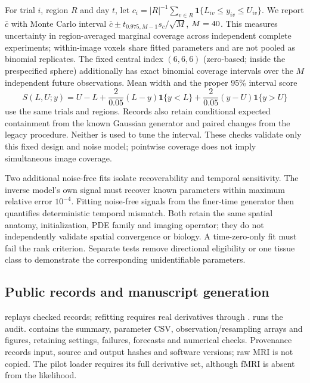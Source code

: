 For trial $i$, region $R$ and day $t$, let $c_i=|R|^{-1}\sum_{v\in R}\mathbf1\{L_{iv}\le y_{iv}\le U_{iv}\}$. We report $\bar c$ with Monte Carlo interval $\bar c\pm t_{0.975,M-1}s_c/\sqrt M$, $M=40{}$. This measures uncertainty in region-averaged marginal coverage across independent complete experiments; within-image voxels share fitted parameters and are not pooled as binomial replicates. The fixed central index $(6,6,6)$ (zero-based; inside the prespecified sphere) additionally has exact binomial coverage intervals over the $M$ independent future observations. Mean width and the proper 95\% interval score \citep{gneiting2007}
\begin{equation}
 S(L,U;y)=U-L+\frac{2}{0.05}(L-y)\mathbf1\{y<L\}
                   +\frac{2}{0.05}(y-U)\mathbf1\{y>U\}
\end{equation}
use the same trials and regions. Records also retain conditional expected containment from the known Gaussian generator and paired changes from the legacy procedure. Neither is used to tune the interval. These checks validate only this fixed design and noise model; pointwise coverage does not imply simultaneous image coverage.

Two additional noise-free fits isolate recoverability and temporal sensitivity. The inverse model's own signal must recover known parameters within maximum relative error $10^{-4}$. Fitting noise-free signals from the finer-time generator then quantifies deterministic temporal mismatch. Both retain the same spatial anatomy, initialization, PDE family and imaging operator; they do not independently validate spatial convergence or biology. A time-zero-only fit must fail the rank criterion. Separate tests remove directional eligibility or one tissue class to demonstrate the corresponding unidentifiable parameters.

\subsection{Public records and manuscript generation}
 replays checked records; refitting requires real derivatives through .  runs the audit.  contains the summary, parameter CSV, observation/resampling arrays and figures, retaining settings, failures, forecasts and numerical checks. Provenance records input, source and output hashes and software versions; raw MRI is not copied. The pilot loader requires its full derivative set, although fMRI is absent from the likelihood.

